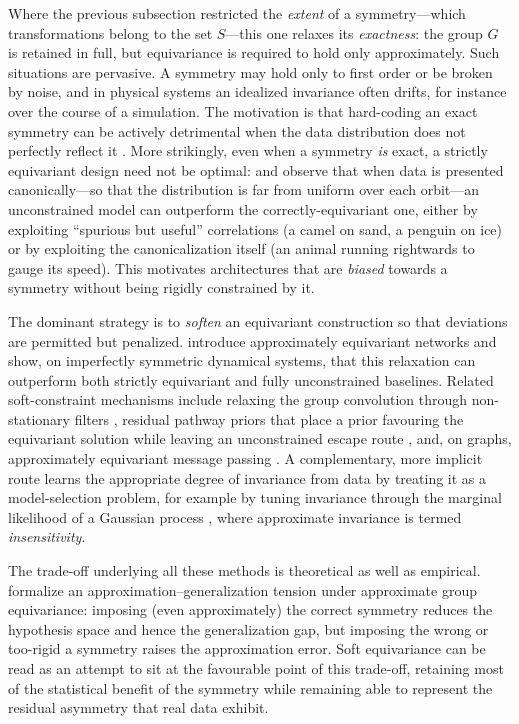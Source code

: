 \documentclass[mathematics,review,submit,moreauthors]{Definitions/mdpi}
\begin{document}
Where the previous subsection restricted the \emph{extent} of a symmetry---which transformations belong to the set $S$---this one relaxes its \emph{exactness}: the group $G$ is retained in full, but equivariance is required to hold only approximately.
Such situations are pervasive.
A symmetry may hold only to first order or be broken by noise, and in physical systems an idealized invariance often drifts, for instance over the course of a simulation.
The motivation is that hard-coding an exact symmetry can be actively detrimental when the data distribution does not perfectly reflect it \citep{zhou2021,finzi2021anips}.
More strikingly, even when a symmetry \emph{is} exact, a strictly equivariant design need not be optimal: \citet{lawrence2026} and \citet{rygiel2026} observe that when data is presented canonically---so that the distribution is far from uniform over each orbit---an unconstrained model can outperform the correctly-equivariant one, either by exploiting ``spurious but useful'' correlations (a camel on sand, a penguin on ice) or by exploiting the canonicalization itself (an animal running rightwards to gauge its speed).
This motivates architectures that are \emph{biased} towards a symmetry without being rigidly constrained by it.

The dominant strategy is to \emph{soften} an equivariant construction so that deviations are permitted but penalized.
\citet{wang2022p3icml} introduce approximately equivariant networks and show, on imperfectly symmetric dynamical systems, that this relaxation can outperform both strictly equivariant and fully unconstrained baselines.
Related soft-constraint mechanisms include relaxing the group convolution through non-stationary filters \citep{ouderaa2022}, residual pathway priors that place a prior favouring the equivariant solution while leaving an unconstrained escape route \citep{finzi2021anips}, and, on graphs, approximately equivariant message passing \citep{huang2023}.
A complementary, more implicit route learns the appropriate degree of invariance from data by treating it as a model-selection problem, for example by tuning invariance through the marginal likelihood of a Gaussian process \citep{vanderwilk2018anips}, where approximate invariance is termed \emph{insensitivity}.

The trade-off underlying all these methods is theoretical as well as empirical.
\citet{petrache2023} formalize an approximation--generalization tension under approximate group equivariance: imposing (even approximately) the correct symmetry reduces the hypothesis space and hence the generalization gap, but imposing the wrong or too-rigid a symmetry raises the approximation error.
Soft equivariance can be read as an attempt to sit at the favourable point of this trade-off, retaining most of the statistical benefit of the symmetry while remaining able to represent the residual asymmetry that real data exhibit.
\end{document}
